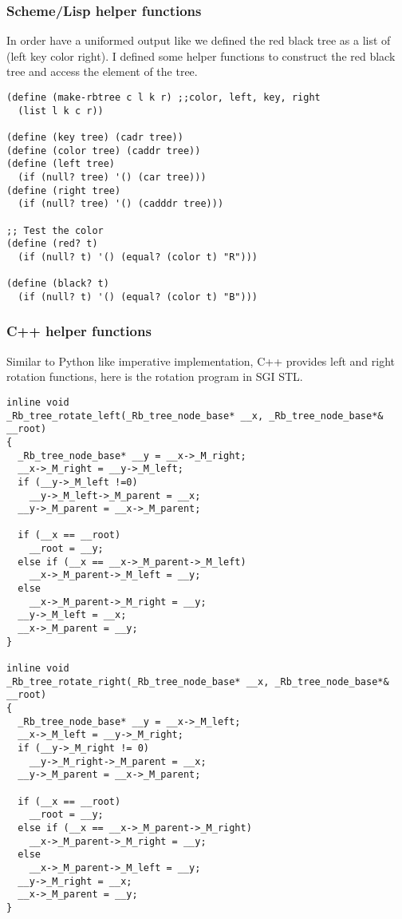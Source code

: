 \documentclass{article}
\begin{document}
\subsubsection*{Scheme/Lisp helper functions}

In order have a uniformed output like we defined the red black tree as a list of (left key color right).
I defined some helper functions to construct the red black tree and access the element of the tree.

\lstset{language=lisp}
\begin{lstlisting}
(define (make-rbtree c l k r) ;;color, left, key, right
  (list l k c r))

(define (key tree) (cadr tree))
(define (color tree) (caddr tree))
(define (left tree) 
  (if (null? tree) '() (car tree)))
(define (right tree)
  (if (null? tree) '() (cadddr tree)))

;; Test the color
(define (red? t)
  (if (null? t) '() (equal? (color t) "R")))

(define (black? t)
  (if (null? t) '() (equal? (color t) "B")))
\end{lstlisting}

\subsubsection*{C++ helper functions}

Similar to Python like imperative implementation, C++ provides left
and right rotation functions, here is the rotation program in SGI STL.

\lstset{language=c++}
\begin{lstlisting}
inline void 
_Rb_tree_rotate_left(_Rb_tree_node_base* __x, _Rb_tree_node_base*& __root)
{
  _Rb_tree_node_base* __y = __x->_M_right;
  __x->_M_right = __y->_M_left;
  if (__y->_M_left !=0)
    __y->_M_left->_M_parent = __x;
  __y->_M_parent = __x->_M_parent;

  if (__x == __root)
    __root = __y;
  else if (__x == __x->_M_parent->_M_left)
    __x->_M_parent->_M_left = __y;
  else
    __x->_M_parent->_M_right = __y;
  __y->_M_left = __x;
  __x->_M_parent = __y;
}

inline void 
_Rb_tree_rotate_right(_Rb_tree_node_base* __x, _Rb_tree_node_base*& __root)
{
  _Rb_tree_node_base* __y = __x->_M_left;
  __x->_M_left = __y->_M_right;
  if (__y->_M_right != 0)
    __y->_M_right->_M_parent = __x;
  __y->_M_parent = __x->_M_parent;

  if (__x == __root)
    __root = __y;
  else if (__x == __x->_M_parent->_M_right)
    __x->_M_parent->_M_right = __y;
  else
    __x->_M_parent->_M_left = __y;
  __y->_M_right = __x;
  __x->_M_parent = __y;
}
\end{lstlisting}
\end{document}
